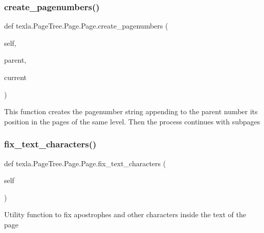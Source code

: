 \subsubsection{\texorpdfstring{create\+\_\+pagenumbers()}{create\_pagenumbers()}}
{\footnotesize\ttfamily def texla.\+Page\+Tree.\+Page.\+Page.\+create\+\_\+pagenumbers (\begin{DoxyParamCaption}\item[{}]{self,  }\item[{}]{parent,  }\item[{}]{current }\end{DoxyParamCaption})}

\begin{DoxyVerb}This function creates the pagenumber string appending to the
parent number its position in the pages of the same level. Then
the process continues with subpages\end{DoxyVerb}
 \hypertarget{classtexla_1_1PageTree_1_1Page_1_1Page_aac15419ccf4b4ca1d50dc91dc2fc8e20}{}\label{classtexla_1_1PageTree_1_1Page_1_1Page_aac15419ccf4b4ca1d50dc91dc2fc8e20} 
\subsubsection{\texorpdfstring{fix\+\_\+text\+\_\+characters()}{fix\_text\_characters()}}
{\footnotesize\ttfamily def texla.\+Page\+Tree.\+Page.\+Page.\+fix\+\_\+text\+\_\+characters (\begin{DoxyParamCaption}\item[{}]{self }\end{DoxyParamCaption})}

\begin{DoxyVerb}Utility function to fix apostrophes and other characters
inside the text of the page\end{DoxyVerb}
 \hypertarget{classtexla_1_1PageTree_1_1Page_1_1Page_a2a63bd250b119f66631c4129ed982093}{}\label{classtexla_1_1PageTree_1_1Page_1_1Page_a2a63bd250b119f66631c4129ed982093} 
